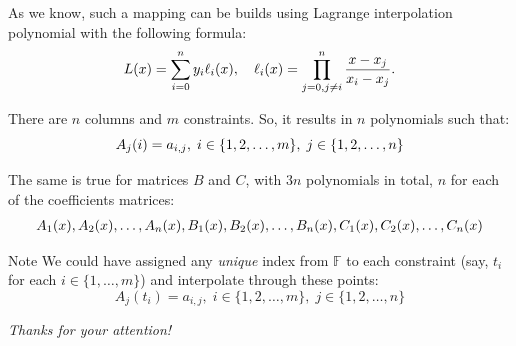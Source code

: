\documentclass{zkdl-presentation-template}
\begin{document}
    \begin{frame}
        As we know, such a mapping can be builds using Lagrange interpolation polynomial with the
        following formula:
        \vspace{-10pt}
        \begin{equation*}
            L(x) = \sum_{i=0}^{n} y_i \ell_i(x), \quad \ell_i(x) = \prod_{j=0, j \neq i}^{n} \frac{x-x_j}{x_i-x_j}.
            \vspace{-10pt}
        \end{equation*}  

        \pause
        There are $n$ columns and $m$ constraints. So, it results in $n$ polynomials such that:
        \vspace{-10pt}
        \begin{equation*}
            A_j(i) = a_{i,j}, \; i \in \{1,2,\dots,m\}, \; j \in \{1,2,\dots,n\}
            \vspace{-10pt}
        \end{equation*}

        \pause
        The same is true for matrices $B$ and $C$, with $3n$ polynomials in total, $n$ for each of the
        coefficients matrices:
        \vspace{-8pt}
        \begin{align*}
            A_1(x), A_2(x), \dots, A_n(x), 
            B_1(x), B_2(x), \dots, B_n(x),
            C_1(x), C_2(x), \dots, C_n(x)
            \vspace{-10pt}
        \end{align*}

        \vspace{-10pt}
        \pause
        \begin{block}{Note}
            We could have assigned any \textit{unique} index from $\mathbb{F}$ to each constraint
            (say, $t_i$ for each $i \in \{1,\dots,m\}$) and interpolate through these points:
            \vspace{-8pt}
            \begin{equation*}
                A_j(t_i) = a_{i,j}, \; i \in \{1,2,\dots,m\}, \; j \in \{1,2,\dots,n\}
            \end{equation*}
        \end{block}
    \end{frame}

    \begin{frame}{}
        \centering \Large
        \emph{Thanks for your attention!}
    \end{frame}
\end{document}
